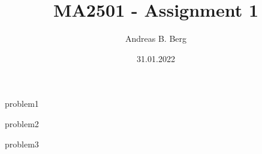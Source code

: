 \documentclass{article}
\begin{document}
\mainmatter

\title{MA2501 - Assignment 1}
\author{Andreas B. Berg}
\date{31.01.2022}
\maketitle
\thispagestyle{fancy}

{problem1}

{problem2}

{problem3}

\end{document}
